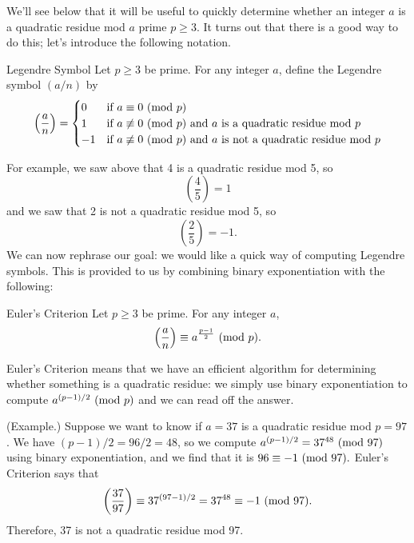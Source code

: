 \documentclass[letterpaper]{article}
\begin{document}
We'll see below that it will be useful to quickly determine whether an integer $a$ is a quadratic residue mod $a$ prime $p \geq 3$. It turns out that there is a good way to do this; let's introduce the following notation. 
\begin{definition}{Legendre Symbol}{}
    Let $p \geq 3$ be prime. For any integer $a$, define the Legendre symbol $(a/n)$ by 
    \[\left(\frac{a}{n}\right) = \begin{cases}
        0 & \text{if } a \equiv 0 \ (\mathrm{mod}\ p) \\ 
        1 & \text{if } a \not\equiv 0 \ (\mathrm{mod}\ p) \text{ and } a \text{ is a quadratic residue mod } p \\ 
        -1 & \text{if } a \not\equiv 0 \ (\mathrm{mod}\ p) \text{ and } a \text{ is not a quadratic residue mod } p
    \end{cases}\]
\end{definition}
For example, we saw above that 4 is a quadratic residue mod 5, so 
\[\left(\frac{4}{5}\right) = 1\]
and we saw that 2 is not a quadratic residue mod 5, so 
\[\left(\frac{2}{5}\right) = -1.\]
We can now rephrase our goal: we would like a quick way of computing Legendre symbols. This is provided to us by combining binary exponentiation with the following: 
\begin{lemma}{Euler's Criterion}{}
    Let $p \geq 3$ be prime. For any integer $a$, 
    \[\left(\frac{a}{n}\right) \equiv a^{\frac{p - 1}{2}} \ (\mathrm{mod}\ p).\]
\end{lemma}

Euler's Criterion means that we have an efficient algorithm for determining whether something is a quadratic residue: we simply use binary exponentiation to compute $a^{(p - 1) / 2} \ (\mathrm{mod}\ p)$ and we can read off the answer. 

\begin{mdframed}
    (Example.) Suppose we want to know if $a = 37$ is a quadratic residue mod $p = 97$. We have $(p - 1) / 2 = 96 / 2 = 48$, so we compute $a^{(p - 1) / 2} = 37^{48} \ (\mathrm{mod}\ 97)$ using binary exponentiation, and we find that it is $96 \equiv -1 \ (\mathrm{mod}\ 97).$ Euler's Criterion says that 
    \[\left(\frac{37}{97}\right) \equiv 37^{(97 - 1) / 2} = 37^{48} \equiv -1 \ (\mathrm{mod}\ 97).\]
    Therefore, 37 is not a quadratic residue mod 97. 
\end{mdframed}
\end{document}
